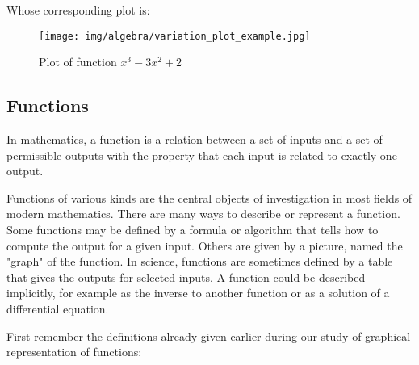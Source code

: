 	Whose corresponding plot is:
	\begin{figure}[H]
		\centering
		\texttt{[image: img/algebra/variation\_plot\_example.jpg]}
		\caption[]{Plot of  function $x^3-3x^2+2$}
	\end{figure}
	
	\pagebreak
	\subsection{Functions}\label{functions}
	In mathematics, a function is a relation between a set of inputs and a set of permissible outputs with the property that each input is related to exactly one output.
	
	Functions of various kinds are the central objects of investigation in most fields of modern mathematics. There are many ways to describe or represent a function. Some functions may be defined by a formula or algorithm that tells how to compute the output for a given input. Others are given by a picture, named the "graph" of the function. In science, functions are sometimes defined by a table that gives the outputs for selected inputs. A function could be described implicitly, for example as the inverse to another function or as a solution of a differential equation.
	
	First remember the definitions already given earlier during our study of graphical representation of functions:
	
